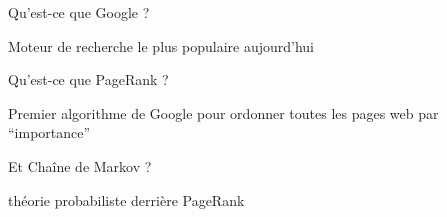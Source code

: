 


\begin{frame}{\Large Qu'est-ce que{ \color{customRed}Google} ?}

\pause
\begin{center}
\Huge Moteur de recherche
\vskip 0.1cm
\Huge le plus populaire
\vskip 0.1cm
\Huge aujourd'hui
\end{center}

\normalsize
\end{frame}


\begin{frame}{\Large Qu'est-ce que {\color{customRed}PageRank} ?}

\begin{center}
\pause \Huge Premier algorithme de Google
\vskip 0.1cm
\pause \Huge pour ordonner
\vskip 0.1cm
\pause \Huge toutes les pages web
\vskip 0.1cm
\pause \Huge par ``importance''
\end{center}

\normalsize
\end{frame}


\begin{frame}{\Large Et {\color{customRed}Cha\^{i}ne de Markov} ?}

\begin{center}
\pause \Huge th\'{e}orie probabiliste
\vskip 0.1cm
\pause \Huge derri\`{e}re PageRank
\end{center}

\normalsize
\end{frame}



